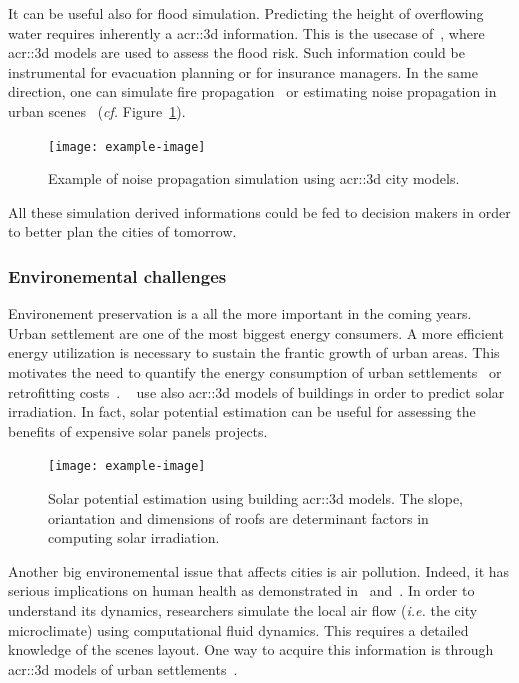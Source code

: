             It can be useful also for flood simulation.
            Predicting the height of overflowing water requires inherently a \gls{acr::3d} information.
            This is the usecase of~\textcite{varduhn2015multi}, where \gls{acr::3d} models are used to assess the flood risk.
            Such information could be instrumental for evacuation planning or for insurance managers.
            In the same direction, one can simulate fire propagation~\parencite{dimitropoulos2010fire} or estimating noise propagation in urban scenes~\parencite{stoter20083d} (\textit{cf.} Figure~\ref{fig::noise_propogation}).
            \begin{figure}[htpb]
                \centering
                \texttt{[image: example-image]}            
                \caption{
                    \label{fig::noise_propogation} Example of noise propagation simulation using \gls{acr::3d} city models.
                }
            \end{figure}
            All these simulation derived informations could be fed to decision makers in order to better plan the cities of tomorrow.

        \subsubsection{Environemental challenges}
            Environement preservation is a all the more important in the coming years.
            Urban settlement are one of the most biggest energy consumers.
            A more efficient energy utilization is necessary to sustain the frantic growth of urban areas.
            This motivates the need to quantify the energy consumption of urban settlements~\parencite{WATE20153372} or retrofitting costs~\parencite{previtali2014automatic}.
            ~\textcite{biljecki2015propagation} use also \gls{acr::3d} models of buildings in order to predict solar irradiation.
            In fact, solar potential estimation can be useful for assessing the benefits of expensive solar panels projects.\\
            \begin{figure}[htpb]
                \centering
                \texttt{[image: example-image]}            
                \caption{
                    \label{fig::solar_potential} Solar potential estimation using building \gls{acr::3d} models.
                    The slope, oriantation and dimensions of roofs are determinant factors in computing solar irradiation.
                }
            \end{figure}
            Another big environemental issue that affects cities is air pollution.
            Indeed, it has serious implications on human health as demonstrated in~\textcite{pascal2013assessing} and~\textcite{chen2013evidence}.
            In order to understand its dynamics, researchers simulate the local air flow (\textit{i.e.} the city microclimate) using computational fluid dynamics.
            This requires a detailed knowledge of the scenes layout.
            One way to acquire this information is through \gls{acr::3d} models of urban settlements~\parencite{ujang2013unified}.
       
